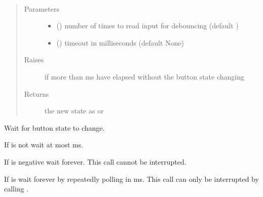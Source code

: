 \documentclass[letterpaper,10pt,english]{sphinxmanual}
\begin{document}
\begin{fulllineitems}
\begin{fulllineitems}
\end{fulllineitems}


\begin{fulllineitems}
\label{\detokenize{index:rcpy.button.Button.pressed_or_released}}~\begin{quote}\begin{description}
\item[{Parameters}] \leavevmode\begin{itemize}
\item {} 
 () \textendash{} number of times to read input for debouncing (default )

\item {} 
 () \textendash{} timeout in milliseconds (default None)

\end{itemize}

\item[{Raises}] \leavevmode
{\hyperref[\detokenize{index:rcpy.gpio.InputTimeout}]{}} \textendash{} if more than  ms have elapsed without the button state changing

\item[{Returns}] \leavevmode
the new state as {\hyperref[\detokenize{index:rcpy.button.PRESSED}]{}} or {\hyperref[\detokenize{index:rcpy.button.RELEASED}]{}}

\end{description}\end{quote}

Wait for button state to change.

If  is not  wait at most  ms.

If  is negative wait forever. This call cannot be interrupted.

If  is  wait forever by repeatedly polling in {\hyperref[\detokenize{index:rcpy.gpio.POLL_TIMEOUT}]{}} ms. This call can only be interrupted by calling {\hyperref[\detokenize{index:rcpy.exit}]{}}.


\end{fulllineitems}
\end{fulllineitems}
\end{document}
